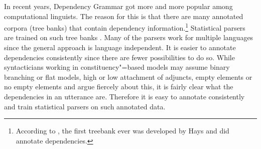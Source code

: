 




%




In recent years, Dependency Grammar got more and more popular among computational linguists. The
reason for this is that there are many annotated corpora (tree banks) that contain dependency
information.\footnote{
  According to \citet{Kay2000a-u}, the first treebank ever was developed by Hays and did
  annotate dependencies.
} Statistical parsers are trained on such tree banks \citep{YM2003a-u,Attardi2006a-u,Nivre2003a-u,KMcDN2009a-u,Bohnet2010a-u}. Many of
the parsers work for multiple languages since the general approach is language independent. It is
easier to annotate dependencies consistently since there are fewer possibilities to do
so.
While
syntacticians working in constituency"=based models may assume binary branching or flat models, high
or low attachment of adjuncts, empty elements or no empty elements and argue fiercely about this,
it is fairly clear what the dependencies in an utterance are. Therefore it is easy to annotate
consistently and train statistical parsers on such annotated data.



